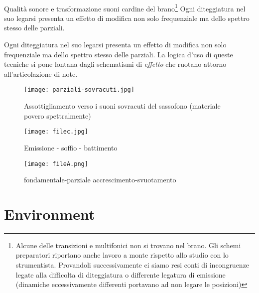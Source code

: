 \clearpage

~

\clearpage





Qualità sonore e trasformazione suoni cardine del brano\footnote{Alcune delle transizioni
e multifonici non si trovano nel brano. Gli schemi preparatori riportano anche lavoro a
monte rispetto allo studio con lo strumentista.  Provandoli successivamente ci siamo
resi conti di incongruenze legate alla difficolta di diteggiatura o differente
legatura di emissione (dinamiche eccessivamente differenti portavano ad non legare le posizioni)}
Ogni diteggiatura nel suo legarsi presenta un effetto di modifica non solo
frequenziale ma dello spettro stesso delle parziali.

Ogni diteggiatura nel suo legarsi presenta un effetto di modifica non solo frequenziale ma
dello spettro stesso delle parziali. La logica d'uso di queste tecniche si pone
lontana dagli schematismi di \emph{effetto} che ruotano attorno all'articolazione di note. 

\vfill

\begin{figure}[h]
\centering
{\texttt{[image: parziali-sovracuti.jpg]}}
\caption[Assottigliamento verso i suoni sovracuti]{Assottigliamento verso i suoni sovracuti del sassofono (materiale povero spettralmente)}
\label{fig:assottiglimento}
\end{figure}
 
\vfill

\begin{figure}[h]
\centering
{\texttt{[image: filec.jpg]}}
\caption[Emissione - soffio - battimento]{Emissione - soffio - battimento}
\label{fig:soffio}
\end{figure}

\vfill
 
\begin{figure}[h]
\centering
{\texttt{[image: fileA.png]}}
\caption[Passaggio microtonale]{fondamentale-parziale accrescimento-svuotamento}
\label{fig:microtoni}
\end{figure}

\section{Environment}

